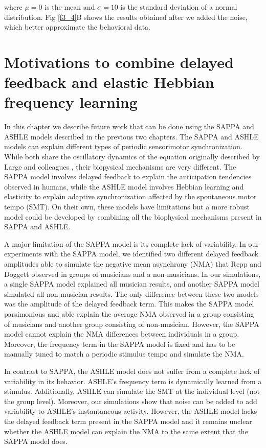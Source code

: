 \documentclass{report}
\begin{document}
where $\mu=0$ is the mean and $\sigma=10$ is the standard deviation of a normal distribution. Fig \ref{f3_4}B shows the results obtained after we added the noise, which better approximate the behavioral data.

\chapter{Motivations to combine delayed feedback and elastic Hebbian frequency learning}

In this chapter we describe future work that can be done using the SAPPA and ASHLE models described in the previous two chapters. The SAPPA and ASHLE models can explain different types of periodic sensorimotor synchronization. While both share the oscillatory dynamics of the equation originally described by Large and colleagues \cite{large2010canonical}, their biopysical mechanisms are very different. The SAPPA model involves delayed feedback to explain the anticipation tendencies observed in humans, while the ASHLE model involves Hebbian learning and elasticity to explain adaptive synchronization affected by the spontaneous motor tempo (SMT). On their own, these models have limitations but a more robust model could be developed by combining all the biophysical mechanisms present in SAPPA and ASHLE.

A major limitation of the SAPPA model is its complete lack of variability. In our experiments with the SAPPA model, we identified two different delayed feedback amplitudes able to simulate the negative mean asynchrony (NMA) that Repp and Doggett \cite{repp2007tapping} observed in groups of musicians and a non-musicians. In our simulations, a single SAPPA model explained all musician results, and another SAPPA model simulated all non-musician results. The only difference between these two models was the amplitude of the delayed feedback term. This makes the SAPPA model parsimonious and able explain the average NMA observed in a group consisting of musicians and another group consisting of non-musician. However, the SAPPA model cannot explain the NMA differences between individuals in a group. Moreover, the frequency term in the SAPPA model is fixed and has to be manually tuned to match a periodic stimulus tempo and simulate the NMA. 

In contrast to SAPPA, the ASHLE model does not suffer from a complete lack of variability in its behavior. ASHLE's frequency term is dynamically learned from a stimulus. Additionally, ASHLE can simulate the SMT at the individual level (not the group level). Moreover, our simulations show that noise can be added to add variability to ASHLE's instantaneous activity. However, the ASHLE model lacks the delayed feedback term present in the SAPPA model and it remains unclear whether the ASHLE model can explain the NMA to the same extent that the SAPPA model does. 
\end{document}
